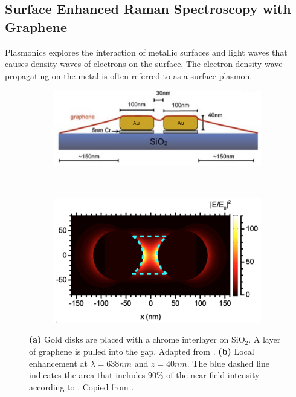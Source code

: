 \subsection{Surface Enhanced Raman Spectroscopy with Graphene}

Plasmonics explores the interaction of metallic surfaces and light waves that causes density waves of electrons on the surface. The electron density wave propagating on the metal is often referred to as a surface plasmon. 

\begin{figure}[!h]
  \centering
  \begin{subfigure}{0.45\textwidth}
    \includegraphics[width=\textwidth]{./images/sers-schema.png}
  \end{subfigure}
  ~
  \begin{subfigure}{0.45\textwidth}
    \includegraphics[width=\textwidth]{./images/local-enhancement-heeg.png}
  \end{subfigure}
  \caption{\textbf{(a)} Gold disks are placed with a chrome interlayer on SiO$_2$. A layer of graphene is pulled into the gap. Adapted from \cite{heeg}. \textbf{(b)} Local enhancement at $\lambda = 638nm$ and $z=40nm$. The blue dashed line indicates the area that includes 90\% of the near field intensity according to \cite{heeg}. Copied from \cite{heeg}.}
  \label{fig:heeg-experiment}
\end{figure}

